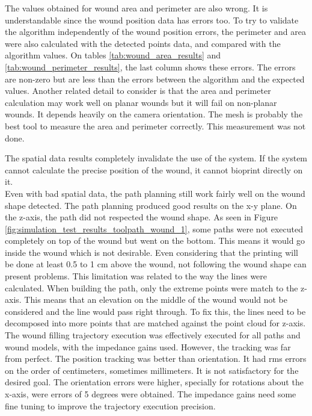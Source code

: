 The values obtained for wound area and perimeter are also wrong. It is understandable since the wound position data has errors too. To try to validate the algorithm independently of the wound position errors, the perimeter and area were also calculated with the detected points data, and compared with the algorithm values. On tables \ref{tab:wound_area_results} and \ref{tab:wound_perimeter_results}, the last column shows these errors. The errors are non-zero but are less than the errors between the algorithm and the expected values. Another related detail to consider is that the area and perimeter calculation may work well on planar wounds but it will fail on non-planar wounds. It depends heavily on the camera orientation. The mesh is probably the best tool to measure the area and perimeter correctly. This measurement was not done.

The spatial data results completely invalidate the use of the system. If the system cannot calculate the precise position of the wound, it cannot bioprint directly on it.\\

Even with bad spatial data, the path planning still work fairly well on the wound shape detected. The path planning produced good results on the x-y plane. On the z-axis, the path did not respected the wound shape. As seen in Figure \ref{fig:simulation_test_results_toolpath_wound_1}, some paths were not executed completely on top of the wound but went on the bottom. This means it would go inside the wound which is not desirable. Even considering that the printing will be done at least 0.5 to 1 cm above the wound, not following the wound shape can present problems. This limitation was related to the way the lines were calculated. When building the path, only the extreme points were match to the z-axis. This means that an elevation on the middle of the wound would not be considered and the line would pass right through. To fix this, the lines need to be decomposed into more points that are matched against the point cloud for z-axis.\\

The wound filling trajectory execution was effectively executed for all paths and wound models, with the impedance gains used. However, the tracking was far from perfect. The position tracking was better than orientation. It had \gls{rms} errors on the order of centimeters, sometimes millimeters. It is not satisfactory for the desired goal. The orientation errors were higher, specially for rotations about the x-axis, were errors of 5 degrees were obtained. The impedance gains need some fine tuning to improve the trajectory execution precision.

